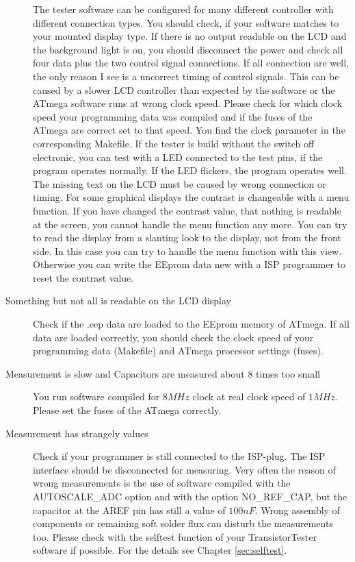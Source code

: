 \begin{description}
The tester software can be configured for many different controller with different connection
types. You should check, if your software matches to your mounted display type.
If there is no output readable on the LCD and the background light is on,
you should disconnect the power and check all four data plus the two control signal connections.
If all connection are well, the only reason I see is a uncorrect timing of
control signals. This can be caused by a slower LCD controller than expected by
the software or the ATmega software runs at wrong clock speed. Please check for which
clock speed your programming data was compiled  and if the fuses of the
ATmega are correct set to that speed. You find the clock parameter in the corresponding
Makefile.
If the tester is build without the switch off electronic, you can test with
a LED connected to the test pins, if the program operates normally.
If the LED flickers, the program operates well. The missing text on the
LCD must be caused by wrong connection or timing.
For some graphical displays the contrast is changeable with a menu function.
If you have changed the contrast value, that nothing is readable at the screen,
you cannot handle the menu function any more. You can try to read the display
from a slanting look to the display, not from the front side.
In this case you can try to handle the menu function with this view.
Otherwise you can write the EEprom data new with a ISP programmer to reset the contrast value.


\item[Something but not all is readable on the LCD display]
Check if the .eep data are loaded to the EEprom memory of ATmega.
If all data are loaded correctly, you should check the clock speed of your
programming data (Makefile) and ATmega processor settings (fuses).

\item[Measurement is slow and Capacitors are measured about 8 times too small]
You run software compiled for \(8MHz\) clock at real clock speed of \(1MHz\).
Please set the fuses of the ATmega correctly.

\item[Measurement has strangely values]
Check if your programmer is still connected to the ISP-plug.
The ISP interface should be disconnected for measuring.
Very often the reason of wrong measurements is the use of software compiled with
the AUTOSCALE\_ADC option and with the option NO\_REF\_CAP, but the capacitor
at the AREF pin has still a value of \(100nF\).
Wrong assembly of components or remaining soft solder flux can disturb the 
measurements too. Please check with the selftest function of your TransistorTester software
if possible. For the details see Chapter \ref{sec:selftest}.


\end{description}
